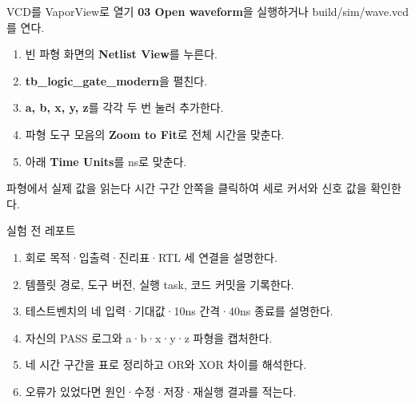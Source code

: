 

\begin{frame}{VCD를 VaporView로 열기}
\small \textbf{03 Open waveform}을 실행하거나 build/sim/wave.vcd를 연다.
\vspace{0.25cm}
\begin{enumerate}\small\setlength{\itemsep}{0.22cm}
\item 빈 파형 화면의 \textbf{Netlist View}를 누른다.
\item \textbf{tb\_logic\_gate\_modern}을 펼친다.
\item \textbf{a, b, x, y, z}를 각각 두 번 눌러 추가한다.
\item 파형 도구 모음의 \textbf{Zoom to Fit}로 전체 시간을 맞춘다.
\item 아래 \textbf{Time Units}를 ns로 맞춘다.
\end{enumerate}
\end{frame}

\begin{frame}{파형에서 실제 값을 읽는다}
\small 시간 구간 안쪽을 클릭하여 세로 커서와 신호 값을 확인한다.
\end{frame}





\begin{frame}{실험 전 레포트}
\small
\begin{enumerate}\setlength{\itemsep}{0.24cm}
\item 회로 목적·입출력·진리표·RTL 세 연결을 설명한다.
\item 템플릿 경로, 도구 버전, 실행 task, 코드 커밋을 기록한다.
\item 테스트벤치의 네 입력·기대값·10ns 간격·40ns 종료를 설명한다.
\item 자신의 PASS 로그와 a·b·x·y·z 파형을 캡처한다.
\item 네 시간 구간을 표로 정리하고 OR와 XOR 차이를 해석한다.
\item 오류가 있었다면 원인·수정·저장·재실행 결과를 적는다.
\end{enumerate}
\end{frame}

